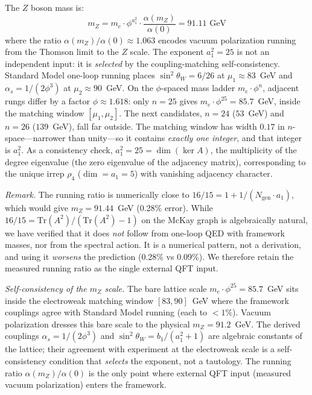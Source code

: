 \documentclass[12pt,a4paper]{article}
\theoremstyle{definition}
\begin{document}
The $Z$ boson mass is:
\begin{equation}
\boxed{m_Z = m_e \cdot \phi^{a_1^2} \cdot \frac{\alpha(m_Z)}{\alpha(0)} = 91.11 \text{ GeV}}
\label{eq:mz}
\end{equation}
where the ratio $\alpha(m_Z)/\alpha(0) \approx 1.063$ encodes vacuum polarization running from the Thomson limit to the $Z$ scale.  The exponent $a_1^2 = 25$ is not an independent input: it is \emph{selected} by the coupling-matching self-consistency.  Standard Model one-loop running places $\sin^2\theta_W = 6/26$ at $\mu_1 \approx 83$~GeV and $\alpha_s = 1/(2\phi^3)$ at $\mu_2 \approx 90$~GeV.  On the $\phi$-spaced mass ladder $m_e \cdot \phi^n$, adjacent rungs differ by a factor $\phi \approx 1.618$: only $n = 25$ gives $m_e \cdot \phi^{25} = 85.7$~GeV, inside the matching window $[\mu_1, \mu_2]$.  The next candidates, $n = 24$ ($53$~GeV) and $n = 26$ ($139$~GeV), fall far outside.  The matching window has width $0.17$ in $n$-space---narrower than unity---so it contains \emph{exactly one integer}, and that integer is $a_1^2$.  As a consistency check, $a_1^2 = 25 = \dim(\ker A)$, the multiplicity of the degree eigenvalue (the zero eigenvalue of the adjacency matrix), corresponding to the unique irrep $\rho_4$ ($\dim = a_1 = 5$) with vanishing adjacency character.

\noindent\textit{Remark.}  The running ratio is numerically close to $16/15 = 1 + 1/(N_{\text{gen}} \cdot a_1)$, which would give $m_Z = 91.44$~GeV (0.28\% error).  While $16/15 = \mathrm{Tr}(A^2)/(\mathrm{Tr}(A^2)-1)$ on the McKay graph is algebraically natural, we have verified that it does \emph{not} follow from one-loop QED with framework masses, nor from the spectral action.  It is a numerical pattern, not a derivation, and using it \emph{worsens} the prediction (0.28\% vs 0.09\%).  We therefore retain the measured running ratio as the single external QFT input.

\noindent\textit{Self-consistency of the $m_Z$ scale.}  The bare lattice scale $m_e \cdot \phi^{25} = 85.7$~GeV sits inside the electroweak matching window $[83, 90]$~GeV where the framework couplings agree with Standard Model running (each to $< 1\%$).  Vacuum polarization dresses this bare scale to the physical $m_Z = 91.2$~GeV.  The derived couplings $\alpha_s = 1/(2\phi^3)$ and $\sin^2\theta_W = b_1/(a_1^2+1)$ are algebraic constants of the lattice; their agreement with experiment at the electroweak scale is a self-consistency condition that \emph{selects} the exponent, not a tautology.  The running ratio $\alpha(m_Z)/\alpha(0)$ is the only point where external QFT input (measured vacuum polarization) enters the framework.
\end{document}
